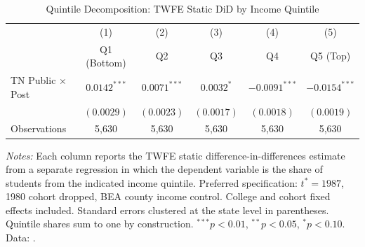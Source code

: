 \begin{table}[H]
\centering
\begin{threeparttable}
\caption{Quintile Decomposition: TWFE Static DiD by Income Quintile}
\label{tab:quintile_decomp}
\begin{tabular}{lccccc}
\toprule
 & (1) & (2) & (3) & (4) & (5) \\
 & Q1 (Bottom) & Q2 & Q3 & Q4 & Q5 (Top) \\
\midrule
TN Public $\times$ Post & $0.0142^{***}$ & $0.0071^{***}$ & $0.0032^{*}$ & $-0.0091^{***}$ & $-0.0154^{***}$ \\
 & $(0.0029)$ & $(0.0023)$ & $(0.0017)$ & $(0.0018)$ & $(0.0019)$ \\
\addlinespace
Observations & 5,630 & 5,630 & 5,630 & 5,630 & 5,630 \\
\bottomrule
\end{tabular}
\begin{tablenotes}[flushleft]
\footnotesize
\item \textit{Notes:} Each column reports the TWFE static
  difference-in-differences estimate from a separate regression in which
  the dependent variable is the share of students from the indicated
  income quintile. Preferred specification: $t^* = 1987$, 1980 cohort
  dropped, BEA county income control. College and cohort fixed effects
  included. Standard errors clustered at the state level in parentheses.
  Quintile shares sum to one by construction. $^{***}p<0.01$,
  $^{**}p<0.05$, $^{*}p<0.10$. Data: \textcite{chetty2020mobility}.
\end{tablenotes}
\end{threeparttable}
\end{table}



